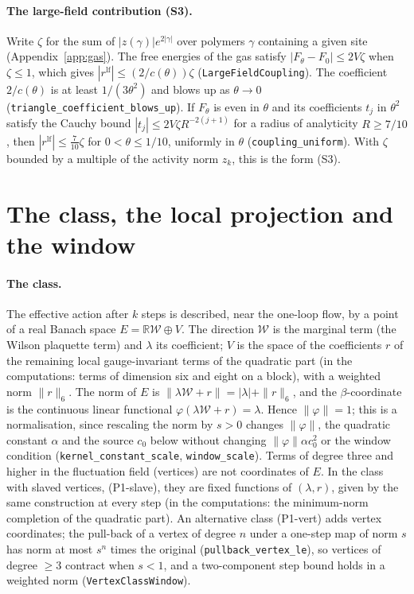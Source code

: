 \documentclass[11pt,a4paper]{article}
\theoremstyle{definition}
\theoremstyle{remark}
\newcommand{\lt}[1]{\texttt{#1}}
\begin{document}
\paragraph{The large-field contribution (S3).} Write $\zeta$ for the sum of $|z(\gamma)|e^{2|\gamma|}$ over polymers $\gamma$ containing a given site (Appendix~\ref{app:gas}). The free energies of the gas satisfy $|F_\theta-F_0|\le2V\zeta$ when $\zeta\le1$, which gives $|r^{\mathrm{lf}}|\le(2/c(\theta))\zeta$ (\lt{LargeFieldCoupling}). The coefficient $2/c(\theta)$ is at least $1/(3\theta^2)$ and blows up as $\theta\to0$ (\lt{triangle\_\allowbreak{}coefficient\_\allowbreak{}blows\_\allowbreak{}up}). If $F_\theta$ is even in $\theta$ and its coefficients $t_j$ in $\theta^2$ satisfy the Cauchy bound $|t_j|\le2V\zeta R^{-2(j+1)}$ for a radius of analyticity $R\ge7/10$, then $|r^{\mathrm{lf}}|\le\tfrac7{10}\zeta$ for $0<\theta\le1/10$, uniformly in $\theta$ (\lt{coupling\_\allowbreak{}uniform}). With $\zeta$ bounded by a multiple of the activity norm $z_k$, this is the form (S3).

\section{The class, the local projection and the window}\label{app:class}

\paragraph{The class.} The effective action after $k$ steps is described, near the one-loop flow, by a point of a real Banach space $E=\mathbb R\mathcal W\oplus V$. The direction $\mathcal W$ is the marginal term (the Wilson plaquette term) and $\lambda$ its coefficient; $V$ is the space of the coefficients $r$ of the remaining local gauge-invariant terms of the quadratic part (in the computations: terms of dimension six and eight on a block), with a weighted norm $\|r\|_6$. The norm of $E$ is $\|\lambda\mathcal W+r\|=|\lambda|+\|r\|_6$, and the $\beta$-coordinate is the continuous linear functional $\varphi(\lambda\mathcal W+r)=\lambda$. Hence $\|\varphi\|=1$; this is a normalisation, since rescaling the norm by $s>0$ changes $\|\varphi\|$, the quadratic constant $\alpha$ and the source $c_0$ below without changing $\|\varphi\|\alpha c_0^2$ or the window condition (\lt{kernel\_\allowbreak{}constant\_\allowbreak{}scale}, \lt{window\_\allowbreak{}scale}). Terms of degree three and higher in the fluctuation field (vertices) are not coordinates of $E$. In the class with slaved vertices, (P1-slave), they are fixed functions of $(\lambda,r)$, given by the same construction at every step (in the computations: the minimum-norm completion of the quadratic part). An alternative class (P1-vert) adds vertex coordinates; the pull-back of a vertex of degree $n$ under a one-step map of norm $s$ has norm at most $s^n$ times the original (\lt{pullback\_\allowbreak{}vertex\_\allowbreak{}le}), so vertices of degree $\ge3$ contract when $s<1$, and a two-component step bound holds in a weighted norm (\lt{VertexClassWindow}).
\end{document}
